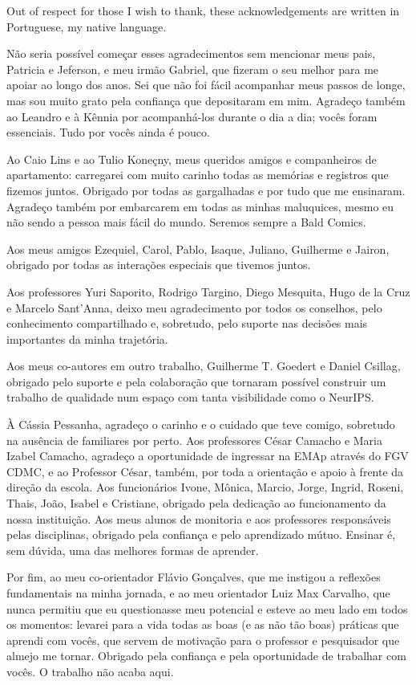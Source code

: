 \begin{agradecimentos}
\vspace*{-.25cm}
Out of respect for those I wish to thank, these acknowledgements are written in Portuguese, my native language.

Não seria possível começar esses agradecimentos sem mencionar meus pais, Patricia e Jeferson, e meu irmão Gabriel, que fizeram o seu melhor para me apoiar ao longo dos anos.
Sei que não foi fácil acompanhar meus passos de longe, mas sou muito grato pela confiança que depositaram em mim.
Agradeço também ao Leandro e à Kênnia por acompanhá-los durante o dia a dia; vocês foram essenciais.
Tudo por vocês ainda é pouco.

Ao Caio Lins e ao Tulio Koneçny, meus queridos amigos e companheiros de apartamento: carregarei com muito carinho todas as memórias e registros que fizemos juntos.
Obrigado por todas as gargalhadas e por tudo que me ensinaram.
Agradeço também por embarcarem em todas as minhas maluquices, mesmo eu não sendo a pessoa mais fácil do mundo.
Seremos sempre a Bald Comics.

Aos meus amigos Ezequiel, Carol, Pablo, Isaque, Juliano, Guilherme e Jairon, obrigado por todas as interações especiais que tivemos juntos.

Aos professores Yuri Saporito, Rodrigo Targino, Diego Mesquita, Hugo de la Cruz e Marcelo Sant'Anna, deixo meu agradecimento por todos os conselhos, pelo conhecimento compartilhado e, sobretudo, pelo suporte nas decisões mais importantes da minha trajetória.

Aos meus co-autores em outro trabalho, Guilherme T. Goedert e Daniel Csillag, obrigado pelo suporte e pela colaboração que tornaram possível construir um trabalho de qualidade num espaço com tanta visibilidade como o NeurIPS.

À Cássia Pessanha, agradeço o carinho e o cuidado que teve comigo, sobretudo na ausência de familiares por perto.
Aos professores César Camacho e Maria Izabel Camacho, agradeço a oportunidade de ingressar na EMAp através do FGV CDMC, e ao Professor César, também, por toda a orientação e apoio à frente da direção da escola.
Aos funcionários Ivone, Mônica, Marcio, Jorge, Ingrid, Roseni, Thais, João, Isabel e Cristiane, obrigado pela dedicação ao funcionamento da nossa instituição.
Aos meus alunos de monitoria e aos professores responsáveis pelas disciplinas, obrigado pela confiança e pelo aprendizado mútuo.
Ensinar é, sem dúvida, uma das melhores formas de aprender.

Por fim, ao meu co-orientador Flávio Gonçalves, que me instigou a reflexões fundamentais na minha jornada, e ao meu orientador Luiz Max Carvalho, que nunca permitiu que eu questionasse meu potencial e esteve ao meu lado em todos os momentos: levarei para a vida todas as boas (e as não tão boas) práticas que aprendi com vocês, que servem de motivação para o professor e pesquisador que almejo me tornar.
Obrigado pela confiança e pela oportunidade de trabalhar com vocês.
O trabalho não acaba aqui.

\end{agradecimentos}